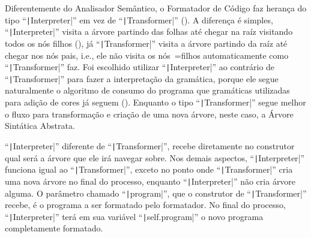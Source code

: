 Diferentemente do Analisador Semântico,
o Formatador de Código faz herança do tipo ``\texttt|Interpreter|'' em vez de ``\texttt|Transformer|'' ().
A diferença é simples,
``\texttt|Interpreter|'' visita a árvore partindo das folhas até chegar na raíz visitando todos os nós filhos (),
já ``\texttt|Transformer|'' visita a árvore partindo da raíz até chegar nos nós pais,
i.e.,
ele não visita os nós~=filhos automaticamente como ``\texttt|Transformer|'' faz.
Foi escolhido utilizar ``\texttt|Interpreter|'' ao contrário de ``\texttt|Transformer|'' para fazer a interpretação da gramática,
porque ele segue naturalmente o algoritmo de consumo do programa que gramáticas utilizadas para adição de cores já seguem ().
Enquanto o tipo ``\texttt|Transformer|'' segue melhor o fluxo para transformação e
criação de uma nova árvore,
neste caso,
a Árvore Sintática Abstrata.

``\texttt|Interpreter|'' diferente de ``\texttt|Transformer|'',
recebe diretamente no construtor qual será a árvore que ele irá navegar sobre.
Nos demais aspectos,
``\texttt|Interpreter|'' funciona igual ao ``\texttt|Transformer|'',
exceto no ponto onde ``\texttt|Transformer|'' cria uma nova árvore no final do processo,
enquanto ``\texttt|Interpreter|'' não cria árvore alguma.
O parâmetro chamado ``\texttt|program|'',
que o construtor de ``\texttt|Transformer|'' recebe,
é o programa a ser formatado pelo formatador.
No final do processo,
``\texttt|Interpreter|'' terá em sua variável ``\texttt|self.program|'' o novo programa completamente formatado.

